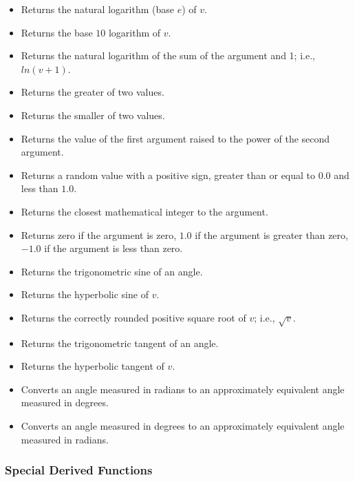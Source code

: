 \documentclass{article}
\begin{document}
\begin{itemize}
\item {\bf {} }   Returns the natural logarithm (base $e$) of $v$.
\item {\bf {} }   Returns the base $10$ logarithm of $v$.
\item {\bf {} }   Returns the natural logarithm of the sum of the argument and 1; i.e., $ln(v + 1)$.
\item {\bf {} }   Returns the greater of two values.
\item {\bf {} }   Returns the smaller of two values.
\item {\bf {} }   Returns the value of the first argument raised to the power of the second argument.
\item {\bf {} }   Returns a random value with a positive sign, greater than or equal to $0.0$ and less than $1.0$.
\item {\bf {} }   Returns the closest mathematical integer to the argument.
\item {\bf {} }  Returns zero if the argument is zero, $1.0$ if the argument is greater than zero, $-1.0$ if the argument is less than zero.
\item {\bf {} }   Returns the trigonometric sine of an angle.
\item {\bf {} }   Returns the hyperbolic sine of $v$.
\item {\bf {} }   Returns the correctly rounded positive square root of $v$; i.e., $\sqrt{v}$.
\item {\bf {} }   Returns the trigonometric tangent of an angle.
\item {\bf {} }   Returns the hyperbolic tangent of $v$.
\item {\bf {} }   Converts an angle measured in radians to an approximately equivalent angle measured in degrees.
\item {\bf {} }   Converts an angle measured in degrees to an approximately equivalent angle measured in radians.

\end{itemize}
\subsubsection{Special Derived Functions}
\end{document}
